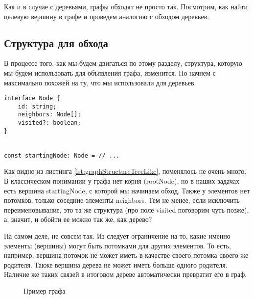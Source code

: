 \documentclass[../../article.tex]{subfiles}
\begin{document}

{Как и в случае с деревьями, графы обходят не просто так. Посмотрим, как найти целевую вершину в графе и проведем аналогию с обходом деревьев.}

\subsection{Структура для обхода}

В процессе того, как мы будем двигаться по этому разделу, структура, которую мы будем использовать для объявления графа, изменится. Но начнем с максимально похожей на ту, что мы использовали для деревьев.

\begin{ruledelement}
    \begin{lstlisting}[caption={Структура вершины графа}, label={lst:graphStructureTreeLike}]
interface Node {
    id: string;
    neighbors: Node[];
    visited?: boolean;
}


const startingNode: Node = // ...
    \end{lstlisting}
\end{ruledelement}

Как видно из листинга \ref{lst:graphStructureTreeLike}, поменялось не очень много. В классическом понимании у графа нет корня ({\firacodebold rootNode}), но в наших задачах есть вершина {\firacodebold startingNode}, с которой мы начинаем обход. Также у элементов нет потомков, только соседние элементы {\firacodebold neighbors}. Тем не менее, если исключить переименовывание, это та же структура (про поле {\firacodebold visited} поговорим чуть позже), а, значит, и обойти ее можно так же, как дерево?

На самом деле, не совсем так. Из  следует ограничение на то, какие именно элементы (вершины) могут быть потомками для других элементов. То есть, например, вершина-потомок не может иметь в качестве своего потомка своего же родителя. Также вершина дерева не может иметь больше одного родителя. Наличие же таких связей в итоговом дереве автоматически превратит его в граф.

\begin{figure}
    \caption{Пример графа}
    \label{fig:treeTurningToGraph}
\end{figure}
\end{document}
